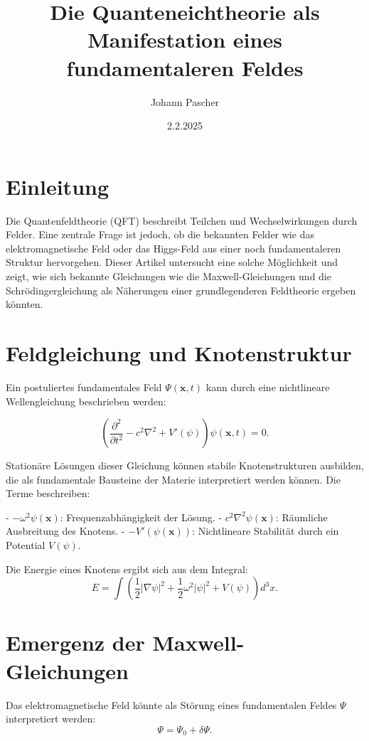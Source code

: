 \documentclass{article}
\title{\textbf{Die Quanteneichtheorie als Manifestation eines fundamentaleren Feldes}}
\author{Johann Pascher}
\date{2.2.2025}
\begin{document}
	
	\maketitle
	
	\section{Einleitung}
	Die Quantenfeldtheorie (QFT) beschreibt Teilchen und Wechselwirkungen durch Felder. Eine zentrale Frage ist jedoch, ob die bekannten Felder wie das elektromagnetische Feld oder das Higgs-Feld aus einer noch fundamentaleren Struktur hervorgehen. Dieser Artikel untersucht eine solche Möglichkeit und zeigt, wie sich bekannte Gleichungen wie die Maxwell-Gleichungen und die Schrödingergleichung als Näherungen einer grundlegenderen Feldtheorie ergeben könnten.
	
	\section{Feldgleichung und Knotenstruktur}
	Ein postuliertes fundamentales Feld $\Psi(\mathbf{x},t)$ kann durch eine nichtlineare Wellengleichung beschrieben werden:
	
	\begin{equation}
		\left( \frac{\partial^2}{\partial t^2} - c^2 \nabla^2 + V'(\psi) \right) \psi(\mathbf{x},t) = 0.
	\end{equation}
	
	Stationäre Lösungen dieser Gleichung können stabile Knotenstrukturen ausbilden, die als fundamentale Bausteine der Materie interpretiert werden können. Die Terme beschreiben:
	
	- $-\omega^2 \psi(\mathbf{x})$: Frequenzabhängigkeit der Lösung.
	- $c^2 \nabla^2 \psi(\mathbf{x})$: Räumliche Ausbreitung des Knotens.
	- $-V'(\psi(\mathbf{x}))$: Nichtlineare Stabilität durch ein Potential $V(\psi)$.
	
	Die Energie eines Knotens ergibt sich aus dem Integral:
	\begin{equation}
		E = \int \left( \frac{1}{2} \left| \nabla \psi \right|^2 + \frac{1}{2} \omega^2 \left| \psi \right|^2 + V(\psi) \right) d^3x.
	\end{equation}
	
	\section{Emergenz der Maxwell-Gleichungen}
	Das elektromagnetische Feld könnte als Störung eines fundamentalen Feldes $\Psi$ interpretiert werden:
	\begin{equation}
		\Psi = \Psi_0 + \delta \Psi.
	\end{equation}
	
\end{document}
